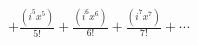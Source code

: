 \documentclass[preview]{standalone}
\begin{document}
\begin{align*}
+ \frac{(i^5x^5)}{5!}+ \frac{(i^6x^6)}{6!} + \frac{(i^7x^7)}{7!} + \cdots
\end{align*}
\end{document}
